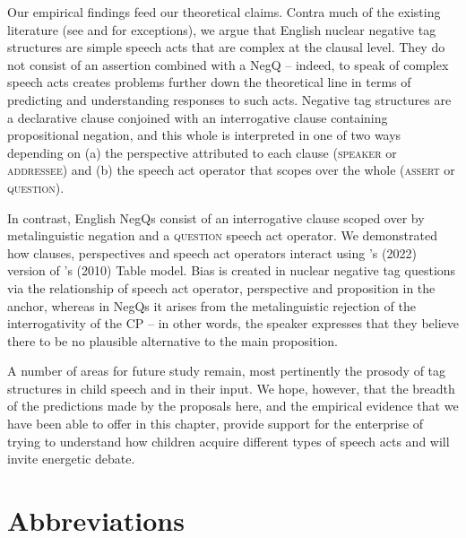 \documentclass[output=paper,colorlinks,citecolor=brown]{langscibook}
\begin{document}
Our empirical findings feed our theoretical claims. Contra much of the existing literature (see \citealt{holmberg2016} and \cite{krifka2015SALT} for exceptions), we argue that English nuclear negative tag structures are simple speech acts that are complex at the clausal level. They do not consist of an assertion combined with a NegQ -- indeed, to speak of complex speech acts creates problems further down the theoretical line in terms of predicting and understanding responses to such acts. Negative tag structures are a declarative clause conjoined with an interrogative clause containing propositional negation, and this whole is interpreted in one of two ways depending on (a) the perspective attributed to each clause (\textsc{speaker} or \textsc{addressee}) and (b) the speech act operator that scopes over the whole (\textsc{assert} or \textsc{question}).

In contrast, English NegQs consist of an interrogative clause scoped over by metalinguistic negation and a \textsc{question} speech act operator. We demonstrated how clauses, perspectives and speech act operators interact using \citeauthor{farkas2022}'s (2022) version of \citeauthor{farkasbruce2010}'s (2010) Table model. Bias is created in nuclear negative tag questions via the relationship of speech act operator, perspective and proposition in the anchor, whereas in NegQs it arises from the metalinguistic rejection of the interrogativity of the CP – in other words, the speaker expresses that they believe there to be no plausible alternative to the main proposition.

\largerpage
A number of areas for future study remain, most pertinently the prosody of tag structures in child speech and in their input. We hope, however, that the breadth of the predictions made by the proposals here, and the empirical evidence that we have been able to offer in this chapter, provide support for the enterprise of trying to understand how children acquire different types of speech acts and will invite energetic debate.

\section*{Abbreviations}
\end{document}
